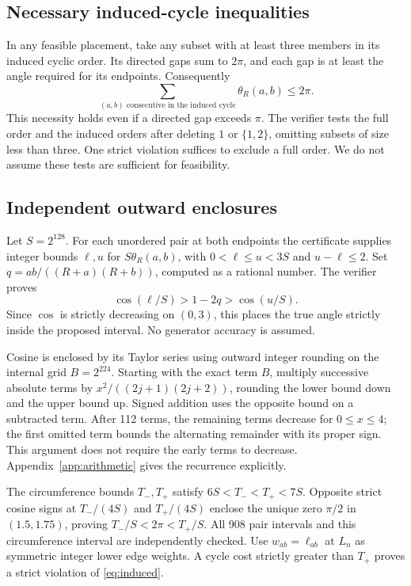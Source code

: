 \documentclass[11pt]{article}
\theoremstyle{definition}
\theoremstyle{remark}
\begin{document}
\subsection{Necessary induced-cycle inequalities}
In any feasible placement, take any subset with at least three members
in its induced cyclic order. Its directed gaps sum to $2\pi$, and each
gap is at least the angle required for its endpoints. Consequently
\begin{equation}\label{eq:induced}
 \sum_{(a,b)\text{ consecutive in the induced cycle}}\theta_R(a,b)
 \le2\pi.
\end{equation}
This necessity holds even if a directed gap exceeds $\pi$. The verifier
tests the full order and the induced orders after deleting $1$ or
$\{1,2\}$, omitting subsets of size less than three. One strict violation
suffices to exclude a full order. We do not assume these tests are sufficient
for feasibility.

\subsection{Independent outward enclosures}
Let $S=2^{128}$. For each unordered pair at both endpoints the certificate
supplies integer bounds $\ell,u$ for $S\theta_R(a,b)$, with
$0<\ell\le u<3S$ and $u-\ell\le2$. Set
$q=ab/((R+a)(R+b))$, computed as a rational number. The verifier proves
\begin{equation}\label{eq:coscheck}
 \cos(\ell/S)>1-2q>\cos(u/S).
\end{equation}
Since $\cos$ is strictly decreasing on $(0,3)$, this places the true
angle strictly inside the proposed interval. No generator accuracy is assumed.

Cosine is enclosed by its Taylor series using outward integer rounding on
the internal grid $B=2^{224}$. Starting with the exact term $B$, multiply
successive absolute terms by $x^2/((2j+1)(2j+2))$, rounding the lower
bound down and the upper bound up. Signed addition uses the opposite bound
on a subtracted term. After 112 terms, the remaining terms decrease for
$0\le x\le4$; the first omitted term bounds the alternating remainder
with its proper sign. This argument does not require the early terms to
decrease. Appendix~\ref{app:arithmetic} gives the recurrence explicitly.

The circumference bounds $T_-,T_+$ satisfy $6S<T_-<T_+<7S$.
Opposite strict cosine signs at $T_-/(4S)$ and $T_+/(4S)$ enclose
the unique zero $\pi/2$ in $(1.5,1.75)$, proving
$T_-/S<2\pi<T_+/S$. All 908 pair intervals and this circumference
interval are independently checked. Use $w_{ab}=\ell_{ab}$ at $L_n$
as symmetric integer lower edge weights. A cycle cost strictly greater
than $T_+$ proves a strict violation of \eqref{eq:induced}.
\end{document}
